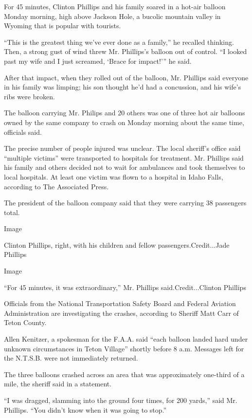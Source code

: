 For 45 minutes, Clinton Phillips and his family soared in a hot-air
balloon Monday morning, high above Jackson Hole, a bucolic mountain
valley in Wyoming that is popular with tourists.

``This is the greatest thing we've ever done as a family,'' he recalled
thinking. Then, a strong gust of wind threw Mr. Phillips's balloon out
of control. ``I looked past my wife and I just screamed, `Brace for
impact!''' he said.

After that impact, when they rolled out of the balloon, Mr. Phillips
said everyone in his family was limping; his son thought he'd had a
concussion, and his wife's ribs were broken.

The balloon carrying Mr. Philips and 20 others was one of three hot air
balloons owned by the same company to crash on Monday morning about the
same time, officials said.

The precise number of people injured was unclear. The local sheriff's
office said ``multiple victims'' were transported to hospitals for
treatment. Mr. Phillips said his family and others decided not to wait
for ambulances and took themselves to local hospitals. At least one
victim was flown to a hospital in Idaho Falls, according to The
Associated Press.

The president of the balloon company said that they were carrying 38
passengers total.

Image

Clinton Phillips, right, with his children and fellow
passengers.Credit...Jade Phillips

Image

``For 45 minutes, it was extraordinary,'' Mr. Phillips
said.Credit...Clinton Phillips

Officials from the National Transportation Safety Board and Federal
Aviation Administration are investigating the crashes, according to
Sheriff Matt Carr of Teton County.

Allen Kenitzer, a spokesman for the F.A.A. said ``each balloon landed
hard under unknown circumstances in Teton Village'' shortly before 8
a.m. Messages left for the N.T.S.B. were not immediately returned.

The three balloons crashed across an area that was approximately
one-third of a mile, the sheriff said in a statement.

``I was dragged, slamming into the ground four times, for 200 yards,''
said Mr. Phillips. ``You didn't know when it was going to stop.''

